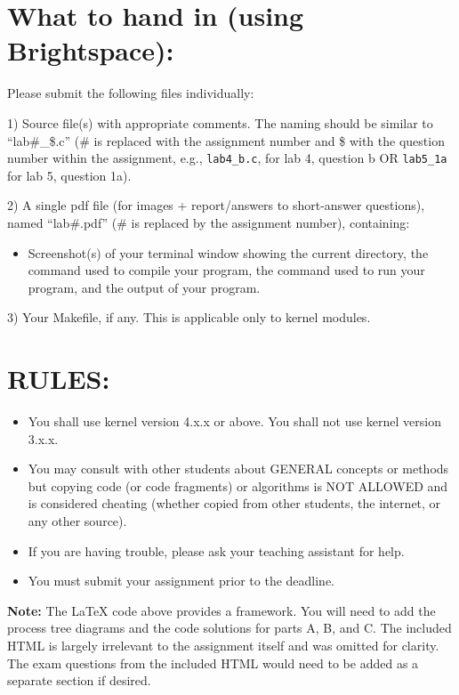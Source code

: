 \documentclass{article}
\begin{document}
\section*{What to hand in (using Brightspace):}

Please submit the following files individually:

1) Source file(s) with appropriate comments. The naming should be similar to “lab\#\_\$.c” (\# is replaced with the assignment number and \$ with the question number within the assignment, e.g., \texttt{lab4\_b.c}, for lab 4, question b OR \texttt{lab5\_1a} for lab 5, question 1a).

2) A single pdf file (for images + report/answers to short-answer questions), named “lab\#.pdf” (\# is replaced by the assignment number), containing:
    \begin{itemize}
        \item Screenshot(s) of your terminal window showing the current directory, the command used to compile your program, the command used to run your program, and the output of your program.
    \end{itemize}

3) Your Makefile, if any. This is applicable only to kernel modules.


\section*{RULES:}

\begin{itemize}
    \item You shall use kernel version 4.x.x or above. You shall not use kernel version 3.x.x.
    \item You may consult with other students about GENERAL concepts or methods but copying code (or code fragments) or algorithms is NOT ALLOWED and is considered cheating (whether copied from other students, the internet, or any other source).
    \item If you are having trouble, please ask your teaching assistant for help.
    \item You must submit your assignment prior to the deadline.
\end{itemize}

\vspace{1cm}
\textbf{Note:}  The LaTeX code above provides a framework. You will need to add the process tree diagrams and the code solutions for parts A, B, and C.  The included HTML is largely irrelevant to the assignment itself and was omitted for clarity.  The  exam questions from the included HTML would need to be added as a separate section if desired.
\end{document}
